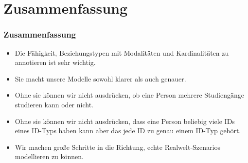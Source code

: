 \documentclass[aspectratio=169,mathserif,notheorems]{beamer}%
\begin{document}
\section{Zusammenfassung}%
%
\begin{frame}%
\frametitle{Zusammenfassung}%
\begin{itemize}%
\item Die Fähigkeit, Beziehungstypen mit Modalitäten und Kardinalitäten zu annotieren ist sehr wichtig.%
%
\item<2-> Sie macht unsere Modelle sowohl klarer als auch genauer.%
%
\item<3-> Ohne sie können wir nicht ausdrücken, ob eine Person mehrere Studiengänge studieren kann oder nicht.%
%
\item<4-> Ohne sie können wir nicht ausdrücken, dass eine Person beliebig viele IDs eines ID-Typs haben kann aber das jede ID zu genau einem ID-Typ gehört.%
%
\item<5-> Wir machen große Schritte in die Richtung, echte Realwelt-Szenarios modellieren zu können.%
\end{itemize}%
\end{frame}%
%
\endPresentation%
\end{document}
